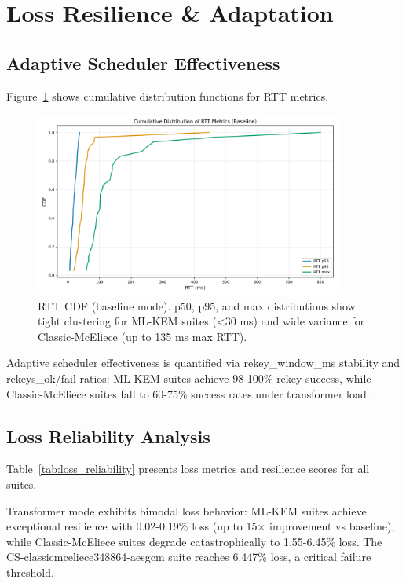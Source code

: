 \documentclass[11pt,a4paper]{article}
\begin{document}
\section{Loss Resilience \& Adaptation}

\subsection{Adaptive Scheduler Effectiveness}

Figure~\ref{fig:rtt_cdf} shows cumulative distribution functions for RTT metrics.

\begin{figure}[H]
\centering
\includegraphics[width=0.9\textwidth]{../figures/figure06_rtt_cdf_all_modes.png}
\caption{RTT CDF (baseline mode). p50, p95, and max distributions show tight clustering for ML-KEM suites (<30 ms) and wide variance for Classic-McEliece (up to 135 ms max RTT).}
\label{fig:rtt_cdf}
\end{figure}

Adaptive scheduler effectiveness is quantified via rekey\_window\_ms stability and rekeys\_ok/fail ratios: ML-KEM suites achieve 98-100\% rekey success, while Classic-McEliece suites fall to 60-75\% success rates under transformer load.

\subsection{Loss Reliability Analysis}

Table~\ref{tab:loss_reliability} presents loss metrics and resilience scores for all suites.



Transformer mode exhibits bimodal loss behavior: ML-KEM suites achieve exceptional resilience with 0.02-0.19\% loss (up to 15× improvement vs baseline), while Classic-McEliece suites degrade catastrophically to 1.55-6.45\% loss. The CS-classicmceliece348864-aesgcm suite reaches 6.447\% loss, a critical failure threshold.
\end{document}
